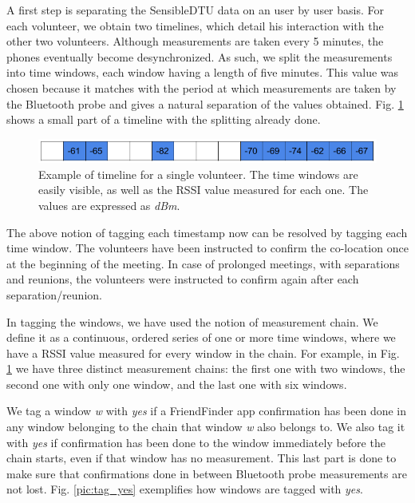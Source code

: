 A first step is separating the SensibleDTU data on an user by user basis. For each volunteer, we obtain two timelines, which detail his interaction with the other two volunteers. Although measurements are taken every 5 minutes, the phones eventually become desynchronized. As such, we split the measurements into time windows, each window having a length of five minutes. This value was chosen because it matches with the period at which measurements are taken by the Bluetooth probe and gives a natural separation of the values obtained. Fig. \ref{pic:value_chain} shows a small part of a timeline with the splitting already done.

\begin{figure}[h]
	\begin{center}
		\includegraphics[scale=0.6]{figures/timechain.png}
	\end{center}
	
	\caption{Example of timeline for a single volunteer. The time windows are easily visible, as well as the RSSI value measured for each one. The values are expressed as \textit{dBm}.}
	\label{pic:value_chain}

\end{figure}

The above notion of tagging each timestamp now can be resolved by tagging each time window. The volunteers have been instructed to confirm the co-location once at the beginning of the meeting. In case of prolonged meetings, with separations and reunions, the volunteers were instructed to confirm again after each separation/reunion.   

In tagging the windows, we have used the notion of measurement chain. We define it as a continuous, ordered series of one or more time windows, where we have a RSSI value measured for every window in the chain. For example, in Fig. \ref{pic:value_chain} we have three distinct measurement chains: the first one with two windows, the second one with only one window, and the last one with six windows.

We tag a window \textit{w} with \textit{yes} if a FriendFinder app confirmation has been done in any window belonging to the chain that window \textit{w} also belongs to. We also tag it with \textit{yes} if confirmation has been done to the window immediately before the chain starts, even if that window has no measurement. This last part is done to make sure that confirmations done in between Bluetooth probe measurements are not lost. Fig. \ref{pic:tag_yes} exemplifies how windows are tagged with \textit{yes}. 

